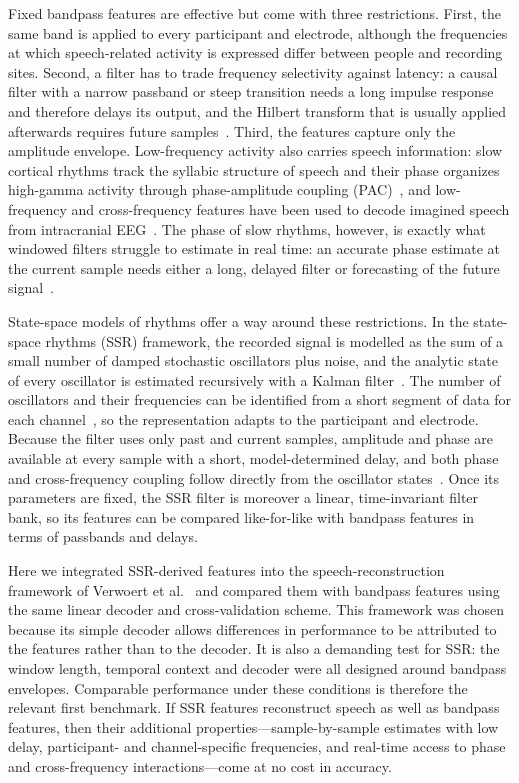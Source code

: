 \documentclass{iopjournal}
\begin{document}
Fixed bandpass features are effective but come with three restrictions. First, the same band is applied to every participant and electrode, although the frequencies at which speech-related activity is expressed differ between people and recording sites. Second, a filter has to trade frequency selectivity against latency: a causal filter with a narrow passband or steep transition needs a long impulse response and therefore delays its output, and the Hilbert transform that is usually applied afterwards requires future samples~\cite{Smetanin2020}. Third, the features capture only the amplitude envelope. Low-frequency activity also carries speech information: slow cortical rhythms track the syllabic structure of speech and their phase organizes high-gamma activity through phase-amplitude coupling (PAC)~\cite{Canolty2006,Canolty2010,Giraud2012,Hyafil2015}, and low-frequency and cross-frequency features have been used to decode imagined speech from intracranial EEG~\cite{Proix2022}. The phase of slow rhythms, however, is exactly what windowed filters struggle to estimate in real time: an accurate phase estimate at the current sample needs either a long, delayed filter or forecasting of the future signal~\cite{Zrenner2020,McIntosh2020,Wodeyar2021}.

State-space models of rhythms offer a way around these restrictions. In the state-space rhythms (SSR) framework, the recorded signal is modelled as the sum of a small number of damped stochastic oscillators plus noise, and the analytic state of every oscillator is estimated recursively with a Kalman filter~\cite{Matsuda2017,Beck2018,Wodeyar2021}. The number of oscillators and their frequencies can be identified from a short segment of data for each channel~\cite{Beck2022SOMATA}, so the representation adapts to the participant and electrode. Because the filter uses only past and current samples, amplitude and phase are available at every sample with a short, model-determined delay, and both phase and cross-frequency coupling follow directly from the oscillator states~\cite{Wodeyar2021,Soulat2022}. Once its parameters are fixed, the SSR filter is moreover a linear, time-invariant filter bank, so its features can be compared like-for-like with bandpass features in terms of passbands and delays.

Here we integrated SSR-derived features into the speech-reconstruction framework of Verwoert et al.~\cite{dataset} and compared them with bandpass features using the same linear decoder and cross-validation scheme. This framework was chosen because its simple decoder allows differences in performance to be attributed to the features rather than to the decoder. It is also a demanding test for SSR: the window length, temporal context and decoder were all designed around bandpass envelopes. Comparable performance under these conditions is therefore the relevant first benchmark. If SSR features reconstruct speech as well as bandpass features, then their additional properties---sample-by-sample estimates with low delay, participant- and channel-specific frequencies, and real-time access to phase and cross-frequency interactions---come at no cost in accuracy.
\end{document}
